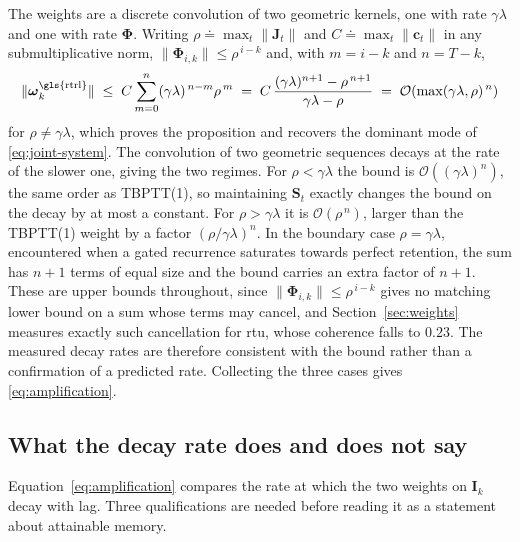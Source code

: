 \documentclass{article}
\begin{document}
The weights are a discrete convolution of two geometric kernels, one with rate
$\gamma\lambda$ and one with rate $\boldsymbol{\Phi}$. Writing
$\rho \doteq \max_t \|\boldsymbol{J}_t\|$ and $C \doteq \max_t \|\boldsymbol{c}_t\|$ in any
submultiplicative norm, $\|\boldsymbol{\Phi}_{i,k}\| \le \rho^{\,i-k}$ and, with
$m = i-k$ and $n = T-k$,
\begin{equation}
    \|\boldsymbol{\omega}_k^{\mathrm{\gls{rtrl}}}\|
    \;\le\; C \sum_{m=0}^{n} (\gamma\lambda)^{\,n-m} \rho^{\,m}
    \;=\; C\,\frac{(\gamma\lambda)^{n+1} - \rho^{\,n+1}}{\gamma\lambda - \rho}
    \;=\; \mathcal{O}\!\left(\max(\gamma\lambda,\rho)^{\,n}\right)
\end{equation}
for $\rho \neq \gamma\lambda$, which proves the proposition and recovers the
dominant mode of \eqref{eq:joint-system}. The convolution of two geometric sequences decays at the rate of the slower one, giving the two
regimes. For $\rho < \gamma\lambda$ the bound is $\mathcal{O}((\gamma\lambda)^{n})$, the same
order as TBPTT(1), so maintaining $\boldsymbol{S}_t$ exactly changes the bound on the decay by at
most a constant. For $\rho > \gamma\lambda$ it is $\mathcal{O}(\rho^{\,n})$, larger than the
TBPTT(1) weight by a factor $(\rho/\gamma\lambda)^{n}$. In the boundary case
$\rho = \gamma\lambda$, encountered when a gated recurrence saturates towards perfect retention,
the sum has $n+1$ terms of equal size and the bound carries an extra factor of $n+1$. These are
upper bounds throughout, since $\|\boldsymbol{\Phi}_{i,k}\| \le \rho^{\,i-k}$ gives no matching lower
bound on a sum whose terms may cancel, and Section~\ref{sec:weights} measures exactly such
cancellation for \gls{rtu}, whose coherence falls to $0.23$. The measured decay rates are
therefore consistent with the bound rather than a confirmation of a predicted rate. Collecting the three cases gives
\eqref{eq:amplification}.

\subsection{What the decay rate does and does not say}
\label{sec:composition-caveats}

Equation~\eqref{eq:amplification} compares the rate at which the two weights on
$\boldsymbol{I}_k$ decay with lag. Three qualifications are needed before reading
it as a statement about attainable memory.
\end{document}
